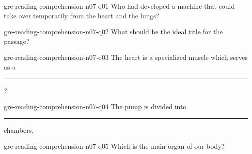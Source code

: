 {\begin{question}{gre-reading-comprehension-n07-q01}
    Who had developed a machine that could take over temporarily from the heart and the lungs?
    \begin{choices}[o]
    \end{choices}
\end{question}

\begin{question}{gre-reading-comprehension-n07-q02}
    What should be the ideal title for the passage?
    \begin{choices}[o]
    \end{choices}
\end{question}

\begin{question}{gre-reading-comprehension-n07-q03}
    The heart is a specialized muscle which serves as a \rule[-0.1pt]{4em}{0.1pt}?
    \begin{choices}[o]
    \end{choices}
\end{question}

\begin{question}{gre-reading-comprehension-n07-q04}
    The pump is divided into \rule[-0.1pt]{4em}{0.1pt} chambers.
    \begin{choices}[o]
    \end{choices}
\end{question}

\begin{question}{gre-reading-comprehension-n07-q05}
    Which is the main organ of our body?
    \begin{choices}[o]
    \end{choices}
\end{question}
}

